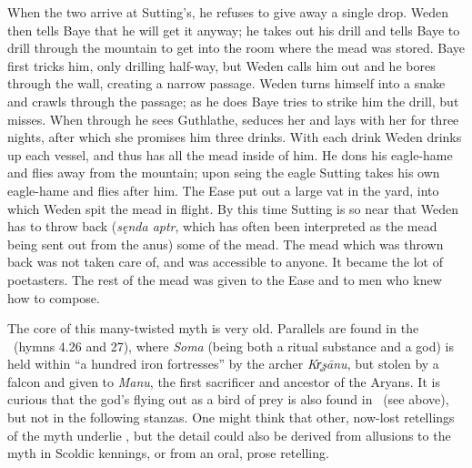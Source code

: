 When the two arrive at Sutting’s, he refuses to give away a single drop. Weden then tells Baye that he will get it anyway; he takes out his drill  and tells Baye to drill through the mountain to get into the room where the mead was stored. Baye first tricks him, only drilling half-way, but Weden calls him out and he bores through the wall, creating a narrow passage. Weden turns himself into a snake and crawls through the passage; as he does Baye tries to strike him the drill, but misses.
When through he sees Guthlathe, seduces her and lays with her for three nights, after which she promises him three drinks. With each drink Weden drinks up each vessel, and thus has all the mead inside of him.
He dons his eagle-hame and flies away from the mountain; upon seing the eagle Sutting takes his own eagle-hame and flies after him. The Ease put out a large vat in the yard, into which Weden spit the mead in flight. By this time Sutting is so near that Weden has to throw back (\emph{sęnda aptr}, which has often been interpreted as the mead being sent out from the anus) some of the mead.
The mead which was thrown back was not taken care of, and was accessible to anyone. It became the lot of poetasters. The rest of the mead was given to the Ease and to men who knew how to compose.

The core of this many-twisted myth is very old. Parallels are found in the \Rigveda\ (hymns 4.26 and 27), where \emph{Soma} (being both a ritual substance and a god) is held within “a hundred iron fortresses” by the archer \emph{Kr̥şānu}, but stolen by a falcon and given to \emph{Manu}, the first sacrificer and ancestor of the Aryans. It is curious that the god’s flying out as a bird of prey is also found in \Skaldskaparmal\ (see above), but not in the following stanzas. One might think that other, now-lost retellings of the myth underlie \Skaldskaparmal, but the detail could also be derived from allusions to the myth in Scoldic kennings, or from an oral, prose retelling.

